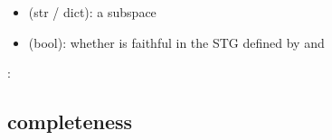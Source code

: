 \documentclass[letterpaper,10pt,english]{sphinxmanual}
\begin{document}
\begin{fulllineitems}
\begin{description}
\begin{itemize}
\item {} 
 (str / dict): a subspace

\end{itemize}

\item[{\sphinxstylestrong{returns}:}] \leavevmode\begin{itemize}
\item {} 
 (bool): whether  is faithful in the STG defined by  and 

\end{itemize}

\end{description}

:

\begin{sphinxVerbatim}[commandchars=\\\{\}]
   
  \PYG{p}{[}\PYG{p}{]}
 
\end{sphinxVerbatim}

\end{fulllineitems}



\subsection{completeness}
\label{\detokenize{AttractorDetection:id6}}\label{\detokenize{AttractorDetection:completeness}}
\end{document}
